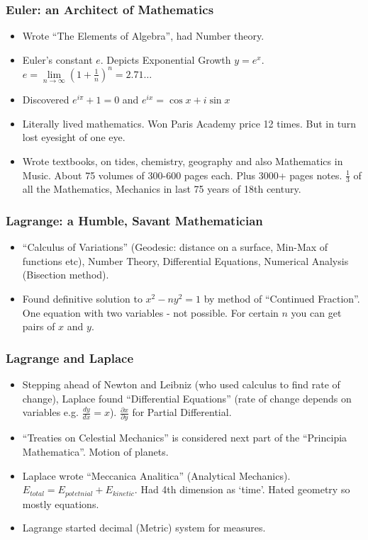 \begin{frame}[fragile]
\frametitle{Euler: an Architect of Mathematics}
\begin{itemize}
\item Wrote ``The Elements of Algebra'', had Number theory.
\item Euler's constant $e$. Depicts Exponential Growth $y=e^x$. $e= \lim \limits_{n \to \infty} (1+\frac{1}{n})^n =2.71\ldots$
\item Discovered $e^{i \pi}+1=0$ and $e^{ix}=\cos{x} + i\sin{x}$
\item Literally lived mathematics. Won Paris Academy price 12 times. But in turn lost eyesight of one eye.
\item Wrote textbooks, on tides, chemistry, geography and also Mathematics in Music. About 75 volumes of 300-600 pages each. Plus 3000+ pages notes. $\frac{1}{3}$ of all the Mathematics, Mechanics in last 75 years of 18th century.
\end{itemize}
\end{frame}


\begin{frame}[fragile]
\frametitle{Lagrange: a Humble, Savant Mathematician}
\begin{itemize}
\item ``Calculus of Variations'' (Geodesic: distance on a surface, Min-Max of functions etc), Number Theory, Differential Equations, Numerical Analysis (Bisection method).
\item Found definitive solution to $x^2-ny^2=1$ by method of ``Continued Fraction''. One equation with two variables - not possible. For certain $n$ you can get pairs of $x$ and $y$.
\end{itemize}
\end{frame}

\begin{frame}[fragile]
\frametitle{Lagrange and Laplace}
\begin{itemize}
\item Stepping ahead of Newton and Leibniz (who used calculus to find rate of change), Laplace found ``Differential Equations'' (rate of change depends on variables e.g. $\frac{dy}{dx}=x$). $\frac{\partial x}{\partial y}$ for Partial Differential.
\item ``Treaties on Celestial Mechanics'' is considered next part of the ``Principia Mathematica''. Motion of planets.
\item Laplace wrote ``Meccanica Analitica'' (Analytical Mechanics). $E_{total} = E_{potetnial} + E_{kinetic}$. Had 4th dimension as `time'. Hated geometry so mostly equations.
\item Lagrange started decimal (Metric) system for measures.
\end{itemize}
\end{frame}


